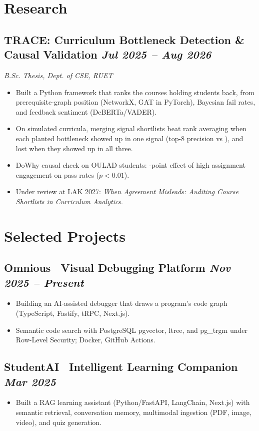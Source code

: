 \documentclass[10pt, a4paper]{article}
\newcommand{\datedsubsection}[2]{%
  \needspace{8\baselineskip}\subsection*{#1 \hfill \small\textit{#2}}%
}
\newcommand{\resitem}[1]{\item #1} %
\begin{document}
\section{Research}
\datedsubsection{TRACE: Curriculum Bottleneck Detection \& Causal Validation}{Jul 2025 -- Aug 2026}
\textit{B.Sc. Thesis, Dept. of CSE, RUET}
\begin{itemize}
    \resitem{Built a Python framework that ranks the courses holding students back, from prerequisite-graph position (NetworkX, GAT in PyTorch), Bayesian fail rates, and feedback sentiment (DeBERTa/VADER).}
    \resitem{On simulated curricula, merging signal shortlists beat rank averaging when each planted bottleneck showed up in one signal (top-8 precision \factLakMerge{} vs \factLakAverage{}), and lost when they showed up in all three.}
    \resitem{DoWhy causal check on \factTraceStudents{} OULAD students: \factTraceEffect{}-point effect of high assignment engagement on pass rates ($p<0.01$).}
    \resitem{Under review at LAK 2027: \textit{When Agreement Misleads: Auditing Course Shortlists in Curriculum Analytics}.}
\end{itemize}

\section{Selected Projects}
\datedsubsection{Omnious \textbar\ Visual Debugging Platform \href{https://www.mehedi-hasan-maruf.me/projects/omnious}{\small\faExternalLink*}}{Nov 2025 -- Present}
\begin{itemize}
    \resitem{Building an AI-assisted debugger that draws a program's code graph (TypeScript, Fastify, tRPC, Next.js).}
    \resitem{Semantic code search with PostgreSQL pgvector, ltree, and pg\_trgm under Row-Level Security; Docker, GitHub Actions.}
\end{itemize}

\datedsubsection{StudentAI \textbar\ Intelligent Learning Companion \href{https://www.mehedi-hasan-maruf.me/projects/student-ai}{\small\faExternalLink*}}{Mar 2025}
\begin{itemize}
    \resitem{Built a RAG learning assistant (Python/FastAPI, LangChain, Next.js) with semantic retrieval, conversation memory, multimodal ingestion (PDF, image, video), and quiz generation.}
\end{itemize}

\end{document}
